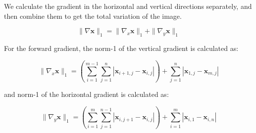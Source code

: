 \documentclass[12pt]{article}
\begin{document}

We calculate the gradient in the horizontal and vertical directions separately, and then combine them to get the total variation of the image. 

\begin{equation}
  \| \nabla \mathbf{x} \|_1 = \| \nabla_x \mathbf{x} \|_1 + \| \nabla_y \mathbf{x} \|_1
\end{equation}




For the forward gradient, the norm-1 of the vertical gradient is calculated as:

\begin{equation}
  \| \nabla_x \mathbf{x} \|_1 = \left( \sum_{i=1}^{m-1} \sum_{j=1}^{n} |\mathbf{x}_{i+1,j} - \mathbf{x}_{i,j}| \right) + \sum_{j=1}^{n} |\mathbf{x}_{1, j} - \mathbf{x}_{m,j}|
\end{equation}

and norm-1 of the horizontal gradient is calculated as:

\begin{equation}
  \| \nabla_y \mathbf{x} \|_1 = \left( \sum_{i=1}^{m} \sum_{j=1}^{n-1} |\mathbf{x}_{i,j+1} - \mathbf{x}_{i,j}| \right) + \sum_{i=1}^{m} |\mathbf{x}_{i, 1} - \mathbf{x}_{i,n}|
\end{equation}


\end{document}
